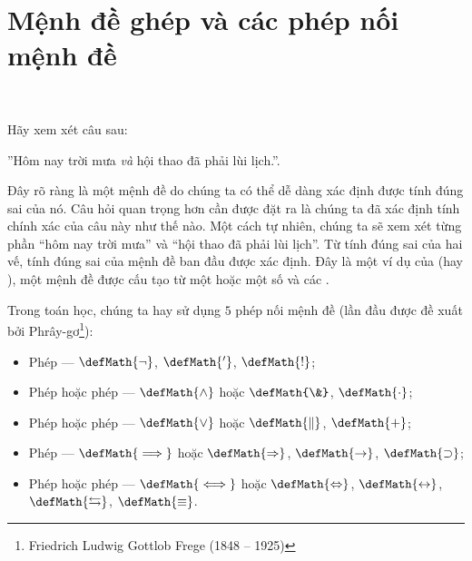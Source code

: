 \section{Mệnh đề ghép và các phép nối mệnh đề}

\ %

Hãy xem xét câu sau:
\begin{center}
   ''Hôm nay trời mưa \emph{và} hội thao đã phải lùi lịch.''.
\end{center}
Đây rõ ràng là một mệnh đề do chúng ta có thể dễ dàng xác định được tính đúng sai của nó. Câu hỏi quan trọng hơn cần được đặt ra là chúng ta đã xác định tính chính xác của câu này như thế nào. Một cách tự nhiên, chúng ta sẽ xem xét từng phần ``hôm nay trời mưa'' và ``hội thao đã phải lùi lịch''. Từ tính đúng sai của hai vế, tính đúng sai của mệnh đề ban đầu được xác định. Đây là một ví dụ của  (hay ), một mệnh đề được cấu tạo từ một hoặc một số  và các .

Trong toán học, chúng ta hay sử dụng $5$ phép nối mệnh đề (lần đầu được đề xuất bởi Phrây-gơ\footnote{Friedrich Ludwig Gottlob Frege (1848 -- 1925)}):
\begin{itemize}
   \item Phép  --- $\defMath{\neg}$, $\defMath{'}$, $\defMath{!}$;
   \item Phép  hoặc phép  --- $\defMath{\land}$ hoặc $\defMath{\&}$, $\defMath{\cdot}$;
   \item Phép  hoặc phép  --- $\defMath{\lor}$ hoặc $\defMath{\parallel}$, $\defMath{+}$;
   \item Phép  --- $\defMath{\implies}$ hoặc $\defMath{\Rightarrow}$, $\defMath{\rightarrow}$, $\defMath{\supset}$;
   \item Phép  hoặc phép  --- $\defMath{\iff}$ hoặc $\defMath{\Leftrightarrow}$, $\defMath{\leftrightarrow}$, $\defMath{\leftrightarrows}$, $\defMath{\equiv}$.
\end{itemize}

